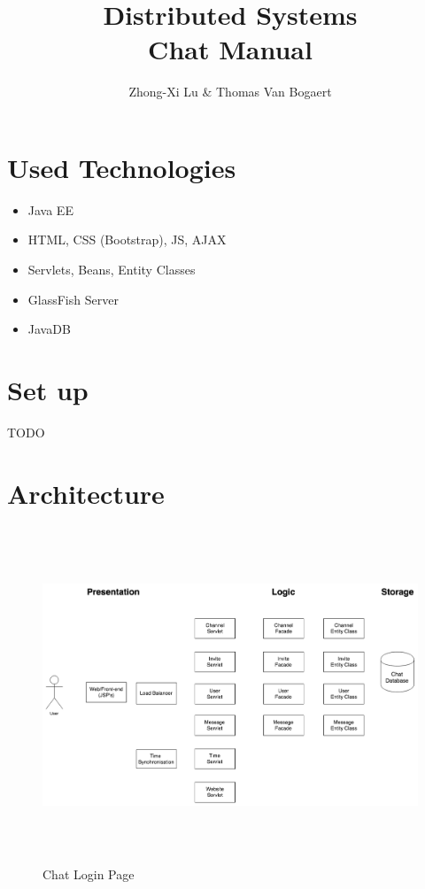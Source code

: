 \documentclass[11pt]{article}
\begin{document}
\author{Zhong-Xi Lu \& Thomas Van Bogaert}
\title{\textbf{Distributed Systems} \\ \Large{Chat Manual}}
\date{}
\maketitle

\section{Used Technologies}

\begin{itemize}
	\item Java EE
	\item HTML, CSS (Bootstrap), JS, AJAX
	\item Servlets, Beans, Entity Classes
	\item GlassFish Server
	\item JavaDB
\end{itemize}

\section{Set up}

TODO

\section{Architecture}

\begin{figure}[H]
\centering
\includegraphics[height=100mm]{architecture.png}
\caption{Chat Login Page}
\end{figure}
\end{document}
